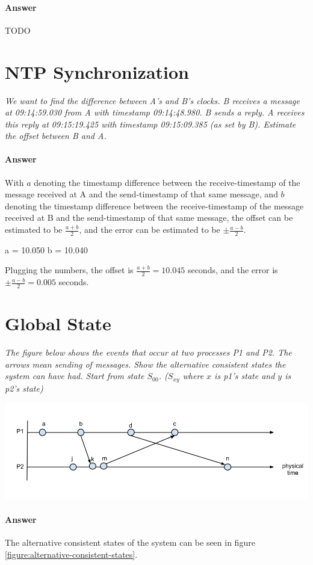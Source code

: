 \documentclass{article}
\newcommand{\singlequestion}[1]{\textit{#1}\bigskip}
\newcommand{\answer}{\paragraph{Answer}}
\begin{document}
\answer
TODO

\section{NTP Synchronization}

\singlequestion{We want to find the difference between A's and B's clocks. B receives a message at 09:14:59.030 from A with timestamp 09:14:48.980. B sends a reply. A receives this reply at 09:15:19.425 with timestamp 09:15:09.385 (as set by B). Estimate the offset between B and A.}

\answer
With $ a $ denoting the timestamp difference between the receive-timestamp of the message received at A and the send-timestamp of that same message, and $ b $ denoting the timestamp difference between the receive-timestamp of the message received at B and the send-timestamp of that same message, the offset can be estimated to be $ \frac{a + b}{2} $, and the error can be estimated to be $ \pm \frac{a - b}{2} $.

a = 10.050
b = 10.040

Plugging the numbers, the offset is $ \frac{a + b}{2} = 10.045 $ seconds, and the error is $ \pm \frac{a - b}{2} = 0.005 $ seconds.

\section{Global State}

\singlequestion{The figure below shows the events that occur at two processes P1 and P2. The arrows mean sending of messages. Show the alternative consistent states the system can have had. Start from state $ S_{00} $. ($ S_{xy} $ where $ x $ is p1's state and $ y $ is p2's state)}

\includegraphics[width=\textwidth]{images/T3-3.png}

\answer
The alternative consistent states of the system can be seen in figure \ref{figure:alternative-consistent-states}.
\end{document}
